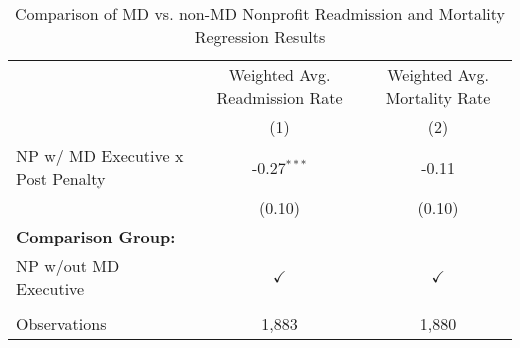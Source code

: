 \begin{table}[htbp]
   \caption{\label{tab:MD_noMD_fullsample} Comparison of MD vs. non-MD Nonprofit Readmission and Mortality Regression Results}
   \bigskip
   \centering
   \begin{tabular}{lcc}
      \toprule
                                        & Weighted Avg. Readmission Rate & Weighted Avg. Mortality Rate\\  
                                        & (1)                            & (2)\\  
      \midrule 
      NP w/ MD Executive x Post Penalty & -0.27$^{***}$                  & -0.11\\   
                                        & (0.10)                         & (0.10)\\   
      \textbf{Comparison Group:}        &                                & \\  
      NP w/out MD Executive             & $\checkmark$                   & $\checkmark$\\   
       \\
      Observations                      & 1,883                          & 1,880\\  
      \bottomrule
   \end{tabular}
\end{table}
